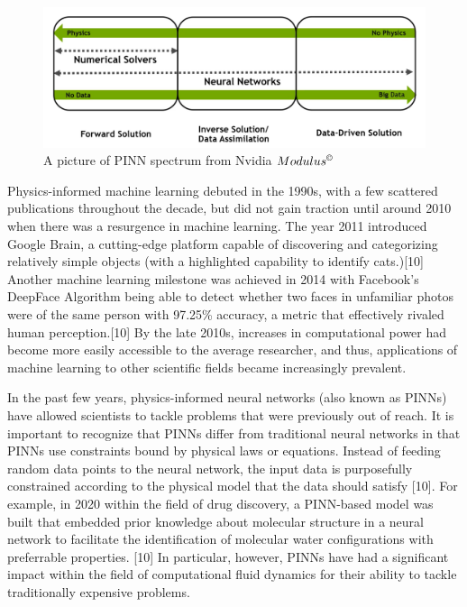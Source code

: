 \documentclass{article}
\begin{document}
	\begin{figure}[ht!]
		\centering
		\includegraphics[scale=0.4]{./images/ai_in_computational_sciences_spectrum.png}
		\caption{A picture of PINN spectrum from Nvidia $Modulus^{\copyright}$ \cite{NVIDIA}}
		\label{fig:CFD_Image}
		\label{fig:PINN_spectrum}
	\end{figure}
	
	
	Physics-informed machine learning debuted in the 1990s, with a few scattered publications throughout the decade, but did not gain traction until around 2010 when there was a resurgence in machine learning. The year 2011 introduced Google Brain, a cutting-edge platform capable of discovering and categorizing relatively simple objects (with a highlighted capability to identify cats.)[10] Another machine learning milestone was achieved in 2014 with Facebook’s DeepFace Algorithm being able to detect whether two faces in unfamiliar photos were of the same person with 97.25\% accuracy, a metric that effectively rivaled human perception.[10] By the late 2010s, increases in computational power had become more easily accessible to the average researcher, and thus, applications of machine learning to other scientific fields became increasingly prevalent. 
	
	In the past few years, physics-informed neural networks (also known as PINNs) have allowed scientists to tackle problems that were previously out of reach. It is important to recognize that PINNs differ from traditional neural networks in that PINNs use constraints bound by physical laws or equations. Instead of feeding random data points to the neural network, the input data is purposefully constrained according to the physical model that the data should satisfy [10]. For example, in 2020 within the field of drug discovery, a PINN-based model was built that embedded prior knowledge about molecular structure in a neural network to facilitate the identification of molecular water configurations with preferrable properties. [10] In particular, however, PINNs have had a significant impact within the field of computational fluid dynamics for their ability to tackle traditionally expensive problems. \cite{PINN_History}
	
\end{document}
